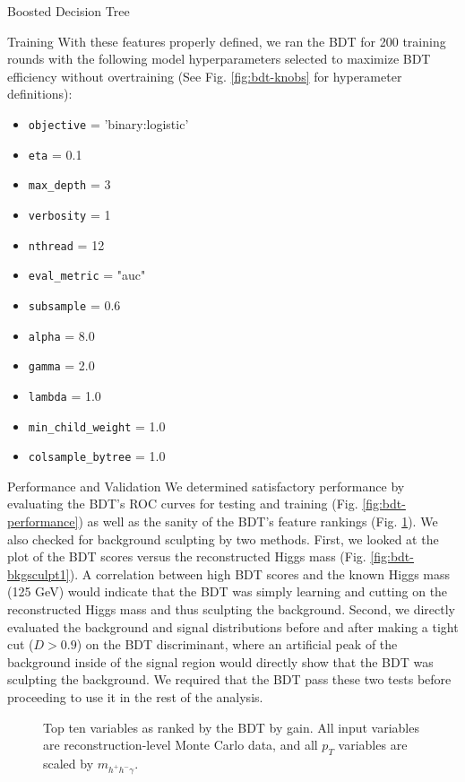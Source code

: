 \begin{section}{Boosted Decision Tree}
\begin{subsection}{Training}
With these features properly defined, we ran the BDT for 200 training rounds with the following model hyperparameters selected to maximize BDT efficiency without overtraining (See Fig. \ref{fig:bdt-knobs} for hyperameter definitions):
\begin{itemize}
    \item \verb|objective| = 'binary:logistic'
    \item \verb|eta| = 0.1
    \item \verb|max_depth| = 3
    \item \verb|verbosity| = 1
    \item \verb|nthread| = 12
    \item \verb|eval_metric| = "auc"
    \item \verb|subsample| = 0.6
    \item \verb|alpha| = 8.0
    \item \verb|gamma| = 2.0
    \item \verb|lambda| = 1.0
    \item \verb|min_child_weight| = 1.0
    \item \verb|colsample_bytree| = 1.0
\end{itemize}

\end{subsection}
\begin{subsection}{Performance and Validation}\label{perf-and-val}
We determined satisfactory performance by evaluating the BDT's ROC curves for testing and training (Fig. \ref{fig:bdt-performance}) as well as the sanity of the BDT's feature rankings (Fig. \ref{fig:bdt-vars}). We also checked for background sculpting by two methods. First, we looked at the plot of the BDT scores versus the reconstructed Higgs mass (Fig. \ref{fig:bdt-bkgsculpt1}). A correlation between high BDT scores and the known Higgs mass (125 GeV) would indicate that the BDT was simply learning and cutting on the reconstructed Higgs mass and thus sculpting the background. Second, we directly evaluated the background and signal distributions before and after making a tight cut ($D > 0.9$) on the BDT discriminant, where an artificial peak of the background inside of the signal region would directly show that the BDT was sculpting the background. We required that the BDT pass these two tests before proceeding to use it in the rest of the analysis.

\begin{figure}[htb]
\begin{center}

\end{center}
\caption{Top ten variables as ranked by the BDT by gain. All input variables are reconstruction-level Monte Carlo data, and all $p_{T}$ variables are scaled by $m_{h^{+}h^{-}\gamma}.$}
\label{fig:bdt-vars}
\end{figure}


\end{subsection}
\end{section}
